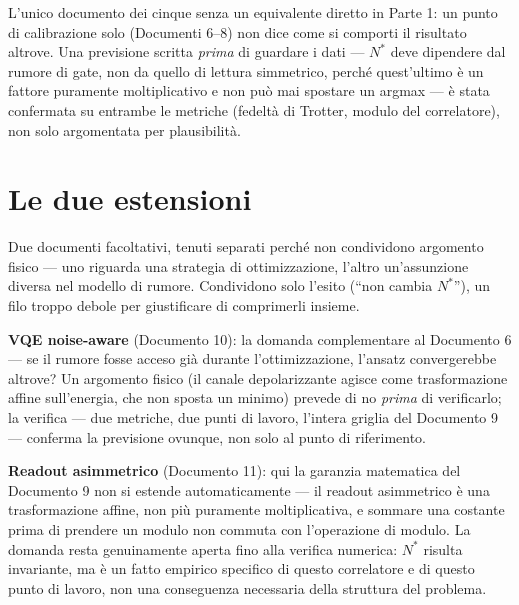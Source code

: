 \documentclass[11pt,a4paper]{article}
\begin{document}
L'unico documento dei cinque senza un equivalente diretto in Parte 1:
un punto di calibrazione solo (Documenti 6--8) non dice come si comporti
il risultato altrove. Una previsione scritta \emph{prima} di guardare i
dati --- $N^*$ deve dipendere dal rumore di gate, non da quello di
lettura simmetrico, perché quest'ultimo è un fattore puramente
moltiplicativo e non può mai spostare un argmax --- è stata confermata
su entrambe le metriche (fedeltà di Trotter, modulo del correlatore),
non solo argomentata per plausibilità.


\section{Le due estensioni}

Due documenti facoltativi, tenuti separati perché non condividono
argomento fisico --- uno riguarda una strategia di ottimizzazione,
l'altro un'assunzione diversa nel modello di rumore. Condividono solo
l'esito (``non cambia $N^*$''), un filo troppo debole per giustificare di
comprimerli insieme.

\textbf{VQE noise-aware} (Documento 10): la domanda complementare al
Documento 6 --- se il rumore fosse acceso già durante l'ottimizzazione,
l'ansatz convergerebbe altrove? Un argomento fisico (il canale
depolarizzante agisce come trasformazione affine sull'energia, che non
sposta un minimo) prevede di no \emph{prima} di verificarlo; la verifica
--- due metriche, due punti di lavoro, l'intera griglia del Documento 9
--- conferma la previsione ovunque, non solo al punto di riferimento.

\textbf{Readout asimmetrico} (Documento 11): qui la garanzia matematica
del Documento 9 non si estende automaticamente --- il readout asimmetrico
è una trasformazione affine, non più puramente moltiplicativa, e
sommare una costante prima di prendere un modulo non commuta con
l'operazione di modulo. La domanda resta genuinamente aperta fino alla
verifica numerica: $N^*$ risulta invariante, ma è un fatto empirico
specifico di questo correlatore e di questo punto di lavoro, non una
conseguenza necessaria della struttura del problema.
\end{document}
